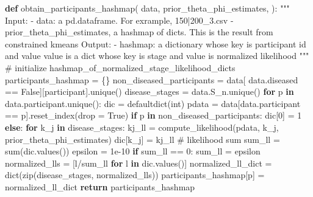 \documentclass[
  letterpaper,
  DIV=11,
  numbers=noendperiod]{scrreprt}
\newenvironment{Shaded}{\begin{snugshade}}{\end{snugshade}}
\newcommand{\BuiltInTok}[1]{\textcolor[rgb]{0.00,0.23,0.31}{#1}}
\newcommand{\CommentTok}[1]{\textcolor[rgb]{0.37,0.37,0.37}{#1}}
\newcommand{\ControlFlowTok}[1]{\textcolor[rgb]{0.00,0.23,0.31}{\textbf{#1}}}
\newcommand{\DecValTok}[1]{\textcolor[rgb]{0.68,0.00,0.00}{#1}}
\newcommand{\FloatTok}[1]{\textcolor[rgb]{0.68,0.00,0.00}{#1}}
\newcommand{\KeywordTok}[1]{\textcolor[rgb]{0.00,0.23,0.31}{\textbf{#1}}}
\newcommand{\NormalTok}[1]{\textcolor[rgb]{0.00,0.23,0.31}{#1}}
\newcommand{\OperatorTok}[1]{\textcolor[rgb]{0.37,0.37,0.37}{#1}}
\newcommand{\StringTok}[1]{\textcolor[rgb]{0.13,0.47,0.30}{#1}}
\newcommand{\VariableTok}[1]{\textcolor[rgb]{0.07,0.07,0.07}{#1}}
\begin{document}
\begin{Shaded}
\begin{Highlighting}[]
\KeywordTok{def}\NormalTok{ obtain\_participants\_hashmap(}
\NormalTok{        data, }
\NormalTok{        prior\_theta\_phi\_estimates,}
\NormalTok{):}
    \CommentTok{"""}
\CommentTok{    Input:}
\CommentTok{        {-} data: a pd.dataframe. For exrample, 150|200\_3.csv}
\CommentTok{        {-} prior\_theta\_phi\_estimates, a hashmap of dicts. }
\CommentTok{            This is the result from constrained kmeans }
\CommentTok{    }
\CommentTok{    Output: }
\CommentTok{        {-} hashmap: a dictionary whose key is participant id}
\CommentTok{            and value value is a dict whose key is stage }
\CommentTok{            and value is normalized likelihood}
\CommentTok{    """}
    \CommentTok{\# initialize hashmap\_of\_normalized\_stage\_likelihood\_dicts}
\NormalTok{    participants\_hashmap }\OperatorTok{=}\NormalTok{ \{\}}
\NormalTok{    non\_diseased\_participants }\OperatorTok{=}\NormalTok{ data[}
\NormalTok{        data.diseased }\OperatorTok{==} \VariableTok{False}\NormalTok{][}\StringTok{\textquotesingle{}participant\textquotesingle{}}\NormalTok{].unique()}
\NormalTok{    disease\_stages }\OperatorTok{=}\NormalTok{ data.S\_n.unique()}
    \ControlFlowTok{for}\NormalTok{ p }\KeywordTok{in}\NormalTok{ data.participant.unique():}
\NormalTok{        dic }\OperatorTok{=}\NormalTok{ defaultdict(}\BuiltInTok{int}\NormalTok{)}
\NormalTok{        pdata }\OperatorTok{=}\NormalTok{ data[data.participant }\OperatorTok{==}\NormalTok{ p].reset\_index(drop }\OperatorTok{=} \VariableTok{True}\NormalTok{)}
        \ControlFlowTok{if}\NormalTok{ p }\KeywordTok{in}\NormalTok{ non\_diseased\_participants:}
\NormalTok{            dic[}\DecValTok{0}\NormalTok{] }\OperatorTok{=} \DecValTok{1}
        \ControlFlowTok{else}\NormalTok{:}
            \ControlFlowTok{for}\NormalTok{ k\_j }\KeywordTok{in}\NormalTok{ disease\_stages:}
\NormalTok{                kj\_ll }\OperatorTok{=}\NormalTok{ compute\_likelihood(pdata, k\_j, prior\_theta\_phi\_estimates)}
\NormalTok{                dic[k\_j] }\OperatorTok{=}\NormalTok{ kj\_ll}
            \CommentTok{\# likelihood sum}
\NormalTok{            sum\_ll }\OperatorTok{=} \BuiltInTok{sum}\NormalTok{(dic.values())}
\NormalTok{            epsilon }\OperatorTok{=} \FloatTok{1e{-}10}
            \ControlFlowTok{if}\NormalTok{ sum\_ll }\OperatorTok{==} \DecValTok{0}\NormalTok{:}
\NormalTok{                sum\_ll }\OperatorTok{=}\NormalTok{ epsilon}
\NormalTok{            normalized\_lls }\OperatorTok{=}\NormalTok{ [l}\OperatorTok{/}\NormalTok{sum\_ll }\ControlFlowTok{for}\NormalTok{ l }\KeywordTok{in}\NormalTok{ dic.values()]}
\NormalTok{            normalized\_ll\_dict }\OperatorTok{=} \BuiltInTok{dict}\NormalTok{(}\BuiltInTok{zip}\NormalTok{(disease\_stages, normalized\_lls))}
\NormalTok{            participants\_hashmap[p] }\OperatorTok{=}\NormalTok{ normalized\_ll\_dict}
    \ControlFlowTok{return}\NormalTok{ participants\_hashmap }


\end{Highlighting}
\end{Shaded}
\end{document}
